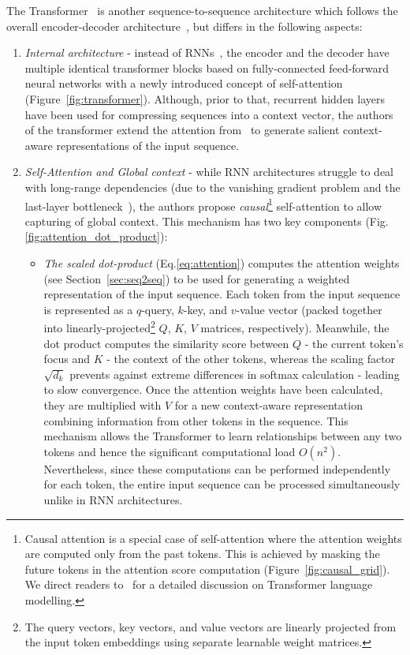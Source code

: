 The Transformer~\cite{vaswani2017attention} is another sequence-to-sequence architecture which follows the overall encoder-decoder architecture~\cite{sutskever2014sequence}, but differs in the following aspects:
\begin{enumerate}
    \item \emph{Internal architecture} - instead of RNNs~\cite{cho-etal-2014-learning}, the encoder and the decoder have multiple identical transformer blocks based on fully-connected feed-forward neural networks with a newly introduced concept of self-attention (Figure~\ref{fig:transformer}).
    Although, prior to that, recurrent hidden layers have been used for compressing sequences into a context vector, the authors of the transformer extend the attention from~\cite{bahdanau2016neural} to generate salient context-aware representations of the input sequence.
    \item \emph{Self-Attention and Global context} - while RNN architectures struggle to deal with long-range dependencies (due to the vanishing gradient problem and the last-layer bottleneck~\cite{bahdanau2016neural}), the authors propose
    \emph{causal}\footnote{
        Causal attention is a special case of self-attention where the attention weights are computed only from the past tokens.
        This is achieved by masking the future tokens in the attention score computation (Figure~\ref{fig:causal_grid}).
        We direct readers to~\cite{jurafsky2000} for a detailed discussion on Transformer language modelling.
    } self-attention to allow capturing of global context.
    This mechanism has two key components (Fig.\ref{fig:attention_dot_product}):
    \begin{itemize}
        \item \emph{The scaled dot-product} (Eq.\ref{eq:attention}) computes the attention weights (see Section~\ref{sec:seq2seq}) to be used for generating a weighted representation of the input sequence.
        Each token from the input sequence is represented as a $q$-query, $k$-key, and $v$-value vector (packed together into linearly-projected\footnote{
            The query vectors, key vectors, and value vectors are linearly projected from the input token embeddings using separate learnable weight matrices.
        } $Q$, $K$, $V$ matrices, respectively).
        Meanwhile, the dot product computes the similarity score between $Q$ - the current token's focus and $K$ - the context of the other tokens, whereas the scaling factor $\sqrt{d_{k}}$ prevents against extreme differences in softmax calculation - leading to slow convergence.
        Once the attention weights have been calculated, they are multiplied with $V$ for a new context-aware representation combining information from other tokens in the sequence.
        This mechanism allows the Transformer to learn relationships between any two tokens and hence the significant computational load $O(n^2)$.
        Nevertheless, since these computations can be performed independently for each token, the entire input sequence can be processed simultaneously unlike in RNN architectures.


\end{itemize}
\end{enumerate}
